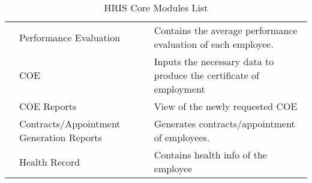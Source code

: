 \begin{table}[H]
\begin{tabular}{@{}p{2cm}p{3.5cm}p{9cm}@{}}
                         & Performance Evaluation                   & Contains the average performance evaluation of each employee.                         \\
                         & COE                                      & Inputs the necessary data to produce the certificate of employment                    \\
                         & COE Reports                              & View of the newly requested COE                                                       \\
                         & Contracts/Appointment Generation Reports & Generates contracts/appointment of employees.                                         \\
                         & Health Record                            & Contains health info of the employee                                                  \\ \bottomrule
    \end{tabular}
    \caption{HRIS Core Modules List}
    \label{tab:hris-basic-modules}
\end{table}
    
